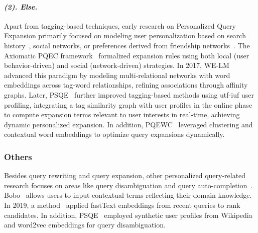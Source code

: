 \paragraph{\textbf{\textit{{(2). Else.}}}}
Apart from tagging-based techniques, early research on Personalized Query Expansion primarily focused on modeling user personalization based on search history~\cite{lin2006personalized}, social networks, or preferences derived from friendship networks~\cite{bender2008exploiting}. The Axiomatic PQEC framework~\cite{mulhem2016axiomatic} formalized expansion rules using both local (user behavior-driven) and social (network-driven) strategies. In 2017, WE-LM~\cite{wu2017personalized} advanced this paradigm by modeling multi-relational networks with word embeddings across tag-word relationships, refining associations through affinity graphs. Later, PSQE~\cite{bouadjenek2019personalized} further improved tagging-based methods using utf-iuf user profiling, integrating a tag similarity graph with user profiles in the online phase to compute expansion terms relevant to user interests in real-time, achieving dynamic personalized expansion. In addition, PQEWC~\cite{bassani2023personalized} leveraged clustering and contextual word embeddings to optimize query expansions dynamically.

\subsubsection{\textbf{Others}}

Besides query rewriting and query expansion, other personalized query-related research focuses on areas like query disambiguation and query auto-completion~\cite{song2024survey}. Bobo~\cite{gao2010utilizing} allows users to input contextual terms reflecting their domain knowledge. In 2019, a method~\cite{kannadasan2019personalized} applied fastText embeddings from recent queries to rank candidates. In addition, PSQE~\cite{baumann2024psqe} employed synthetic user profiles from Wikipedia and word2vec embeddings for query disambiguation.

